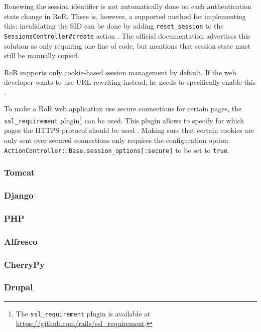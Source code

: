 Renewing the session identifier is not automatically done on each authentication state change in RoR. There is, however, a supported method for implementing this: invalidating the SID can be done by adding \texttt{reset\_session} to the \texttt{SessionsController\#create} action \cite{Webers2008}. The official documentation advertises this solution as only requiring one line of code, but mentions that session state must still be manually copied.

RoR supports only cookie-based session management by default. If the web developer wants to use URL rewriting instead, he needs to specifically enable this \cite{McMahon2010}.

To make a RoR web application use secure connections for certain pages, the \texttt{ssl\_requirement} plugin\footnote{The \texttt{ssl\_requirement} plugin is available at \url{https://github.com/rails/ssl_requirement}.} can be used. This plugin allows to specify for which pages the HTTPS protocol should be used \cite{Slater2008}. Making sure that certain cookies are only sent over secured connections only requires the configuration option \texttt{ActionController::Base.session\_options[:secure]} to be set to \texttt{true}.

\subsubsection{Tomcat}

\subsubsection{Django}

\subsubsection{PHP}

\subsubsection{Alfresco}

\subsubsection{CherryPy}

\subsubsection{Drupal}

